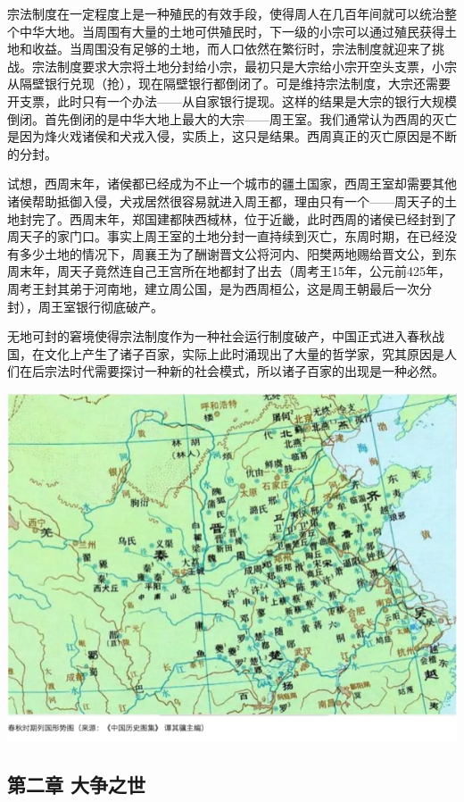 \documentclass[]{book}
\begin{document}
宗法制度在一定程度上是一种殖民的有效手段，使得周人在几百年间就可以统治整个中华大地。当周围有大量的土地可供殖民时，下一级的小宗可以通过殖民获得土地和收益。当周围没有足够的土地，而人口依然在繁衍时，宗法制度就迎来了挑战。宗法制度要求大宗将土地分封给小宗，最初只是大宗给小宗开空头支票，小宗从隔壁银行兑现（抢），现在隔壁银行都倒闭了。可是维持宗法制度，大宗还需要开支票，此时只有一个办法------从自家银行提现。这样的结果是大宗的银行大规模倒闭。首先倒闭的是中华大地上最大的大宗------周王室。我们通常认为西周的灭亡是因为烽火戏诸侯和犬戎入侵，实质上，这只是结果。西周真正的灭亡原因是不断的分封。

试想，西周末年，诸侯都已经成为不止一个城市的疆土国家，西周王室却需要其他诸侯帮助抵御入侵，犬戎居然很容易就进入周王都，理由只有一个------周天子的土地封完了。西周末年，郑国建都陕西棫林，位于近畿，此时西周的诸侯已经封到了周天子的家门口。事实上周王室的土地分封一直持续到灭亡，东周时期，在已经没有多少土地的情况下，周襄王为了酬谢晋文公将河内、阳樊两地赐给晋文公，到东周末年，周天子竟然连自己王宫所在地都封了出去（周考王15年，公元前425年，周考王封其弟于河南地，建立周公国，是为西周桓公，这是周王朝最后一次分封），周王室银行彻底破产。

无地可封的窘境使得宗法制度作为一种社会运行制度破产，中国正式进入春秋战国，在文化上产生了诸子百家，实际上此时涌现出了大量的哲学家，究其原因是人们在后宗法时代需要探讨一种新的社会模式，所以诸子百家的出现是一种必然。

\includegraphics[width=8.33in]{images/gx4}

\subsection{第二章 大争之世}\label{-}
\end{document}
